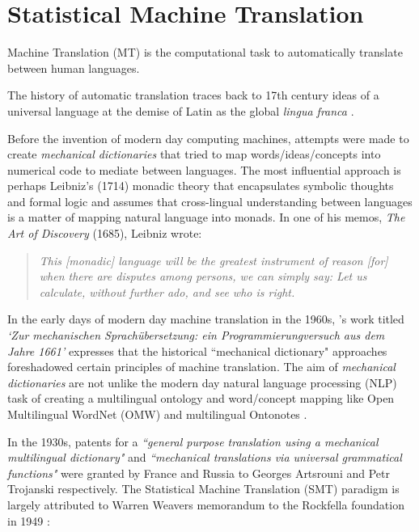 \section{Statistical Machine Translation}

Machine Translation (MT) is the computational task to automatically translate between human languages.

The history of automatic translation traces back to  17th century ideas of a universal language at the demise  of Latin as the global \emph{lingua franca}
\citep{hutchins2000early}.

Before the invention of modern day computing machines, attempts were made to create \emph{mechanical dictionaries} that tried to map words/ideas/concepts into numerical code to mediate between languages. The most influential approach is perhaps Leibniz's (1714) monadic theory that encapsulates symbolic thoughts and formal logic \citep{busche2009gottfried} and assumes that cross-lingual understanding between languages is a matter of mapping natural language into monads. In one of his memos, \emph{The Art of Discovery} (1685), Leibniz wrote:

\blockquote{\emph{This [monadic] language will be the greatest instrument of reason [for] when there are disputes among persons, we can simply say: Let us calculate, without further ado, and see who is right.}}

In the early days of modern day machine translation in the 1960s, \citeauthor{becher1962mechanischen}'s \citeyearpar{becher1962mechanischen} work titled \emph{`Zur mechanischen Sprachübersetzung: ein Programmierungversuch aus dem Jahre 1661'} expresses that the historical ``mechanical dictionary" approaches foreshadowed certain principles of machine translation. The aim of \emph{mechanical dictionaries} are not unlike the modern day natural language processing (NLP) task of creating a multilingual ontology and word/concept mapping like Open Multilingual WordNet (OMW) \citep{bond2012survey} and multilingual Ontonotes \citep{weischedel2010ontonotes}.

In the 1930s, patents for a \emph{``general purpose translation using a mechanical multilingual dictionary"}  and \emph{``mechanical translations via universal grammatical functions"} were granted by France and Russia to Georges Artsrouni and Petr Trojanski respectively. The Statistical Machine Translation (SMT) paradigm is largely attributed to Warren Weavers memorandum to the Rockfella foundation in 1949 \citep{weaver1955translation}:

